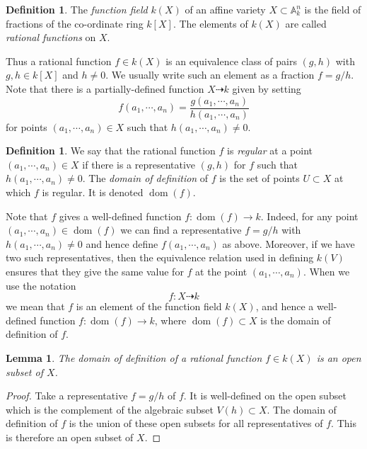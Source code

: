 \documentclass [12pt,oneside,a4paper,mathscr]{amsart}
\newtheorem{lemma}[thm]{Lemma}
\theoremstyle{definition}
\newtheorem{defn}[thm]{Definition}
\newcommand {\A}{\mathbb A}
\newcommand{\dom}{\operatorname{dom}}
\begin{document}
\begin{defn}
The \emph{function field} $k(X)$ of an affine variety $X\subset \A^n_k$ is the field of fractions of the co-ordinate ring $k[X]$. The elements of $k(X)$  are called \emph{rational functions} on $X$.
\end{defn}

Thus a rational function  $f\in k(X)$ is an equivalence class of pairs $(g,h)$ with $g,h\in k[X]$ and $h\neq 0$. We usually write such an element as a fraction $f=g/h$. Note that there is a partially-defined function
$X \dashrightarrow k$
given by setting \[f(a_1,\cdots,a_n)=\frac{g(a_1,\cdots, a_n)}{h(a_1,\cdots, a_n)}\]
 for points $(a_1,\cdots,a_n)\in X$ such that $h(a_1,\cdots,a_n)\neq 0$.

\begin{defn}
We say that the rational function $f$ is \emph{regular} at a point $(a_1,\cdots,a_n)\in X$ if there is a representative $(g,h)$ for $f$ such that $h(a_1,\cdots,a_n)\neq 0$.
The \emph{domain of definition} of $f$ is the set of points $U\subset X$ at which $f$ is regular. It is denoted $\operatorname{dom}(f)$.
\end{defn}

Note that $f$ gives a well-defined function $f\colon \operatorname{dom}(f) \to k$. Indeed, for any point $(a_1,\cdots,a_n)\in \operatorname{dom}(f)$ we can find a representative $f=g/h$ with $h(a_1,\cdots,a_n)\neq 0$ and hence define $f(a_1,\cdots,a_n)$ as above. Moreover, if we have two such representatives, then the equivalence relation used in defining $k(V)$ ensures that they give the same value for $f$ at the point $(a_1,\cdots,a_n)$.
When we use the notation \[f\colon X \dashrightarrow k\] we mean that $f$ is an element of the function field $k(X)$, and hence a well-defined function $f\colon \dom(f)\to k$, where $\operatorname{dom}(f)\subset X$ is the domain of definition of $f$.


\begin{lemma}
The domain of definition of a rational function $f\in k(X)$ is an open subset of $X$.
\end{lemma}

\begin{proof}
Take a representative $f=g/h$ of $f$. It is well-defined on the open subset which is the complement of the algebraic subset $V(h)\subset X$. The domain of definition of $f$ is the union of these open subsets for all representatives of $f$. This is therefore an open subset of $X$.
\end{proof}
\end{document}
